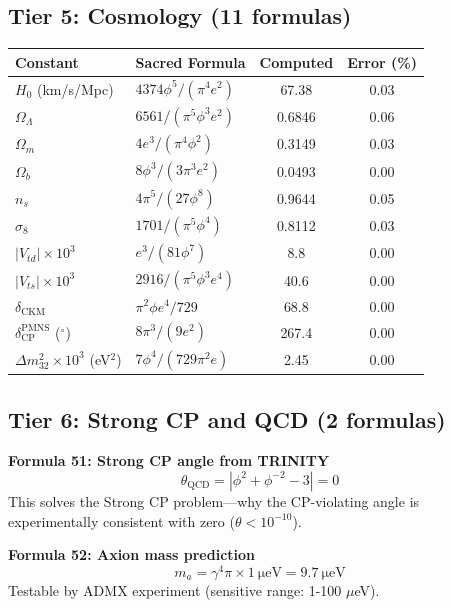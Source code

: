 \documentclass[12pt,a4paper]{article}
\begin{document}
\subsection{Tier 5: Cosmology (11 formulas)}

\begin{longtable}{llcc}
\toprule
\textbf{Constant} & \textbf{Sacred Formula} & \textbf{Computed} & \textbf{Error (\%)} \\
\midrule
$H_0$ (km/s/Mpc) & $4374\phi^5/(\pi^4 e^2)$ & 67.38 & 0.03 \\
$\Omega_\Lambda$ & $6561/(\pi^5\phi^3 e^2)$ & 0.6846 & 0.06 \\
$\Omega_m$ & $4e^3/(\pi^4\phi^2)$ & 0.3149 & 0.03 \\
$\Omega_b$ & $8\phi^3/(3\pi^3 e^2)$ & 0.0493 & 0.00 \\
$n_s$ & $4\pi^5/(27\phi^8)$ & 0.9644 & 0.05 \\
$\sigma_8$ & $1701/(\pi^5\phi^4)$ & 0.8112 & 0.03 \\
$|V_{td}| \times 10^3$ & $e^3/(81\phi^7)$ & 8.8 & 0.00 \\
$|V_{ts}| \times 10^3$ & $2916/(\pi^5\phi^3 e^4)$ & 40.6 & 0.00 \\
$\delta_{\text{CKM}}$ & $\pi^2\phi e^4/729$ & 68.8 & 0.00 \\
$\delta_{\text{CP}}^{\text{PMNS}}$ ($^\circ$) & $8\pi^3/(9e^2)$ & 267.4 & 0.00 \\
$\Delta m_{32}^2 \times 10^3$ (eV$^2$) & $7\phi^4/(729\pi^2 e)$ & 2.45 & 0.00 \\
\bottomrule
\end{longtable}

\subsection{Tier 6: Strong CP and QCD (2 formulas)}

\textbf{Formula 51: Strong CP angle from TRINITY}
\begin{equation}
\theta_{\text{QCD}} = |\phi^2 + \phi^{-2} - 3| = 0
\end{equation}
This solves the Strong CP problem—why the CP-violating angle is experimentally
consistent with zero ($\theta < 10^{-10}$).

\textbf{Formula 52: Axion mass prediction}
\begin{equation}
m_a = \gamma^4 \pi \times \SI{1}{\micro\eV} = \SI{9.7}{\micro\eV}
\end{equation}
Testable by ADMX experiment (sensitive range: 1-100 $\mu$eV).
\end{document}
